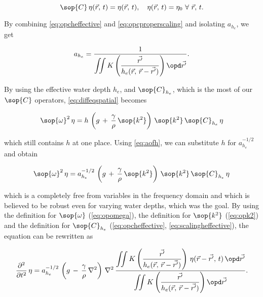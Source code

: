 \begin{equation} \label{eq:opcproperscaling}
\sop{C}\,\eta(\vec{r},\,t) = \eta(\vec{r},\,t),\quad\eta(\vec{r},\,t) = \eta_0\ \forall\ \vec{r},\,t.
\end{equation}

By combining \eqref{eq:opcheffective} and \eqref{eq:opcproperscaling} and isolating $a_{h_e}$, we get

\begin{equation} \label{eq:scalingheffective}
a_{h_e} = \frac{1}{\displaystyle\iint K\left(\frac{\vec{r'}}{h_e(\vec{r},\,\vec{r}-\vec{r'})}\right) \opd\vec{r'}}.
\end{equation}

By using the effective water depth $h_e$, and $\sop{C}_{h_e}$, which is the most  of our $\sop{C}$ operators, \eqref{eq:diffeqspatial} becomes

\begin{equation} \label{eq:diffeqonehstillunknown}
\sop{\omega}^2\,\eta = h\,\left(g\,+\,\frac{\gamma}{\rho}\,\sop{k^2}\right)\,\sop{k^2}\,\sop{C}_{h_e}\,\eta
\end{equation}

which still contains $h$ at one place. Using \eqref{eq:aofh}, we can substitute $h$ for $a_{h_e}^{-1/2}$ and obtain

\begin{equation} \label{eq:diffeqcomplete}
\sop{\omega}^2\,\eta = a_{h_e}^{-1/2}\,\left(g\,+\,\frac{\gamma}{\rho}\,\sop{k^2}\right)\,\sop{k^2}\,\sop{C}_{h_e}\,\eta
\end{equation}

which is a \PDE completely free from variables in the frequency domain and which is believed to be robust even for varying water depths, which was the goal. By using the definition for $\sop{\omega}$ (\eqref{eq:opomega}), the definition for $\sop{k^2}$ (\eqref{eq:opk2}) and the definition for $\sop{C}_{h_e}$ (\eqref{eq:opcheffective}, \eqref{eq:scalingheffective}), the equation can be rewritten as

\begin{equation} \label{eq:diffeqnouserdefinedoperators}
\frac{\partial^2}{\partial t^2}\,\eta = a_{h_e}^{-1/2}\,\left(g\,-\,\frac{\gamma}{\rho}\,\nabla^2\right)\,\nabla^2\,\frac{\displaystyle\iint K\left(\frac{\vec{r'}}{h_e(\vec{r},\,\vec{r}-\vec{r'})}\right)\,\eta(\vec{r}-\vec{r'},\,t)\,\opd\vec{r'}}{\displaystyle\iint K\left(\frac{\vec{r'}}{h_e(\vec{r},\,\vec{r}-\vec{r'})}\right) \opd\vec{r'}}.
\end{equation}

